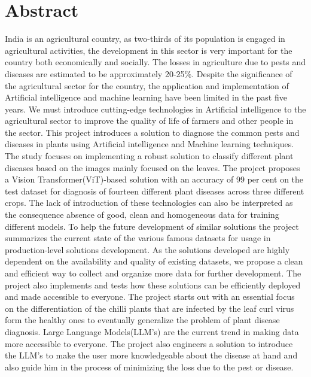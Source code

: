 \documentclass[a4paper, 12pt]{report}
\theoremstyle{definition}
\begin{document}
\chapter*{Abstract}

 India is an agricultural country, as two-thirds of its population is engaged in agricultural activities, the development in this sector is very important for the country both economically and socially.  The losses in agriculture due to pests and diseases are estimated to be approximately 20-25\%. Despite the significance of the agricultural sector for the country, the application and implementation of Artificial intelligence and machine learning have been limited in the past five years. We must introduce cutting-edge technologies in Artificial intelligence to the agricultural sector to improve the quality of life of farmers and other people in the sector. This project introduces a solution to diagnose the common pests and diseases in plants using Artificial intelligence and Machine learning techniques. The study focuses on implementing a robust solution to classify different plant diseases based on the images mainly focused on the leaves. The project proposes a Vision Transformer(ViT)-based solution with an accuracy of 99 per cent on the test dataset for diagnosis of fourteen different plant diseases across three different crops. The lack of introduction of these technologies can also be interpreted as the consequence absence of good, clean and homogeneous data for training different models. To help the future development of similar solutions the project summarizes the current state of the various famous datasets for usage in production-level solutions development. As the solutions developed are highly dependent on the availability and quality of existing datasets, we propose a clean and efficient way to collect and organize more data for further development. The project also implements and tests how these solutions can be efficiently deployed and made accessible to everyone. The project starts out with an essential focus on the differentiation of the chilli plants that are infected by the leaf curl virus form the healthy ones to eventually generalize the problem of plant disease diagnosis.  Large Language Models(LLM's) are the current trend in making data more accessible to everyone. The project also engineers a solution to introduce the LLM's to make the user more knowledgeable about the disease at hand and also guide him in the process of minimizing the loss due to the pest or disease.
\end{document}
